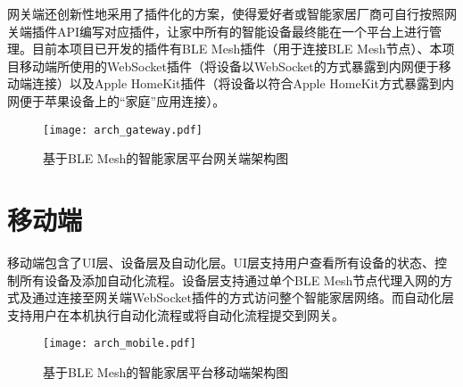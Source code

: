 网关端还创新性地采用了插件化的方案，使得爱好者或智能家居厂商可自行按照网关端插件API编写对应插件，让家中所有的智能设备最终能在一个平台上进行管理。目前本项目已开发的插件有BLE Mesh插件（用于连接BLE Mesh节点）、本项目移动端所使用的WebSocket插件（将设备以WebSocket的方式暴露到内网便于移动端连接）以及Apple HomeKit插件（将设备以符合Apple HomeKit方式暴露到内网便于苹果设备上的“家庭”应用连接）。
\begin{figure}[H]
    \centering
    \texttt{[image: arch\_gateway.pdf]}
    \caption{基于BLE Mesh的智能家居平台网关端架构图}
    \label{fig:arch}
\end{figure}

\section{移动端}
\label{design:mobile}
移动端包含了UI层、设备层及自动化层。UI层支持用户查看所有设备的状态、控制所有设备及添加自动化流程。设备层支持通过单个BLE Mesh节点代理入网的方式及通过连接至网关端WebSocket插件的方式访问整个智能家居网络。而自动化层支持用户在本机执行自动化流程或将自动化流程提交到网关。
\begin{figure}[H]
    \centering
    \texttt{[image: arch\_mobile.pdf]}
    \caption{基于BLE Mesh的智能家居平台移动端架构图}
    \label{fig:arch}
\end{figure}
